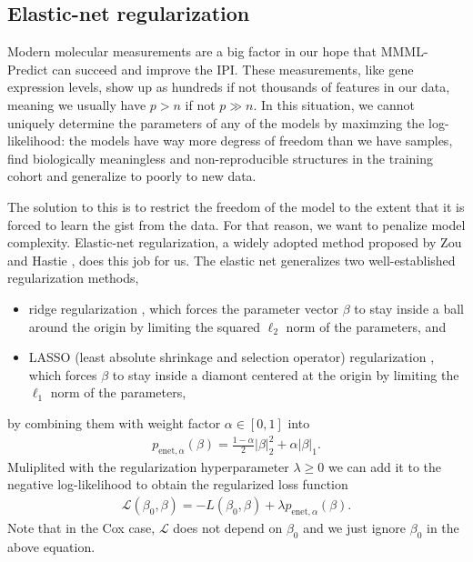 \subsection{Elastic-net regularization}

Modern molecular measurements are a big factor in our hope that MMML-Predict can succeed and improve 
the IPI. These measurements, like gene expression levels, show up as hundreds if not thousands of 
features in our data, meaning we usually have $p > n$ if not $p \gg n$. In this situation, we 
cannot uniquely determine the parameters of any of the models by maximzing the log-likelihood: 
the models have way more degress of freedom than we have samples, find biologically meaningless 
and non-reproducible structures in the training cohort and generalize to poorly to new data.

The solution to this is to restrict the freedom of the model to the extent that it is forced to 
learn the gist from the data. For that reason, we want to penalize model complexity. Elastic-net 
regularization, a widely adopted method proposed by Zou and Hastie \cite{elasticnet05}, does this 
job for us. The elastic net generalizes two well-established regularization methods,
\begin{itemize}
    \item ridge regularization \cite{ridge70}, which forces the parameter vector $\beta$ to 
        stay inside a ball around the origin by limiting the squared $\ell_2$ norm 
        of the parameters, and 
    \item LASSO (least absolute shrinkage and selection operator) regularization \cite{lasso18}, 
        which forces $\beta$ to stay inside a diamont centered at the origin by limiting the 
        $\ell_1$ norm of the parameters,
\end{itemize}
by combining them with weight factor $\alpha \in [0, 1]$ into 
\begin{align}
    p_{\text{enet}, \alpha}(\beta) = \frac{1-\alpha}{2} |\beta|_2^2 + \alpha |\beta|_1.
\end{align}
Muliplited with the regularization hyperparameter $\lambda \geq 0$ we can add it to the negative 
log-likelihood to obtain the regularized loss function
\begin{align}
    \mathcal{L}(\beta_0, \beta) = -L(\beta_0, \beta) + \lambda p_{\text{enet}, \alpha}(\beta).
\end{align}
Note that in the Cox case, $\mathcal{L}$ does not depend on $\beta_0$ and we just ignore $\beta_0$ 
in the above equation. 

